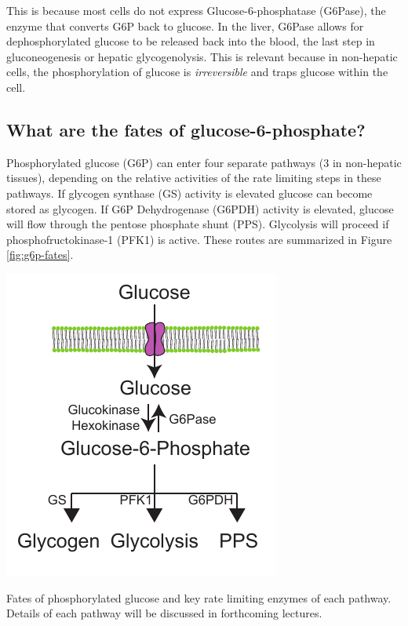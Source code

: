 \documentclass{tufte-handout}
\begin{document}
  This is because most cells do not express Glucose-6-phosphatase (G6Pase), the enzyme that converts G6P back to glucose.  In the liver, G6Pase allows for dephosphorylated glucose to be released back into the blood, the last step in gluconeogenesis or hepatic glycogenolysis.  This is relevant because in non-hepatic cells, the phosphorylation of glucose is \emph{irreversible} and traps glucose within the cell.

\subsection{What are the fates of glucose-6-phosphate?}

Phosphorylated glucose (G6P) can enter four separate pathways (3 in non-hepatic tissues), depending on the relative activities of the rate limiting steps in these pathways.  If glycogen synthase (GS) activity is elevated glucose can become stored as glycogen.  If G6P Dehydrogenase (G6PDH) activity is elevated, glucose will flow through the pentose phosphate shunt (PPS).  Glycolysis will proceed if phosphofructokinase-1 (PFK1) is active.  These routes are summarized in Figure \ref{fig:g6p-fates}.

\begin{marginfigure}
\includegraphics{figures/g6p-fates.pdf}
\caption{Fates of phosphorylated glucose and key rate limiting enzymes of each pathway.  Details of each pathway will be discussed in forthcoming lectures.}
\label{fig:g6p-fates}
\end{marginfigure}
\end{document}
